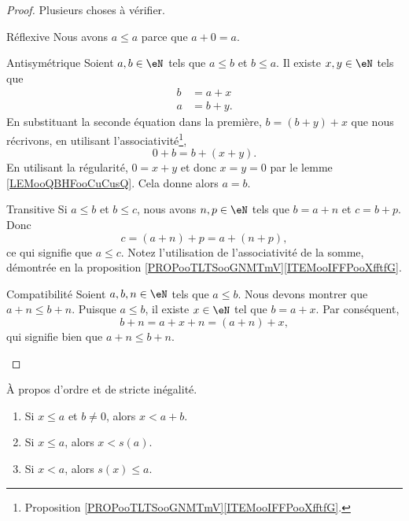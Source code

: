 \begin{proof}
	Plusieurs choses à vérifier.
	\begin{subproof}
		\item[Réflexive]
		Nous avons \( a\leq a\) parce que \( a+0=a\).
		\item[Antisymétrique]
		Soient \( a,b\in \eN\) tels que \( a\leq b\) et \( b\leq a\). Il existe \( x,y\in \eN\) tels que
		\begin{subequations}
			\begin{align}
				b & =a+x  \\
				a & =b+y.
			\end{align}
		\end{subequations}
		En substituant la seconde équation dans la première, \( b=(b+y)+x\) que nous récrivons, en utilisant l'associativité\footnote{Proposition \ref{PROPooTLTSooGNMTmV}\ref{ITEMooIFFPooXfftfG}.},
		\begin{equation}
			0+b=b+(x+y).
		\end{equation}
		En utilisant la régularité, \( 0=x+y\) et donc \( x=y=0\) par le lemme \ref{LEMooQBHFooCuCusQ}. Cela donne alors \( a=b\).
		\item[Transitive]
		Si \( a\leq b\) et \( b\leq c\), nous avons \( n,p\in \eN\) tels que \( b=a+n\) et \( c=b+p\). Donc
		\begin{equation}
			c=(a+n)+p=a+(n+p),
		\end{equation}
		ce qui signifie que \( a\leq c\). Notez l'utilisation de l'associativité de la somme, démontrée en la proposition \ref{PROPooTLTSooGNMTmV}\ref{ITEMooIFFPooXfftfG}.
		\item[Compatibilité]
		Soient \( a,b,n\in \eN\) tels que \( a\leq b\). Nous devons montrer que \( a+n\leq b+n\). Puisque \( a\leq b\), il existe \( x\in \eN\) tel que \( b=a+x\). Par conséquent,
		\begin{equation}
			b+n=a+x+n=(a+n)+x,
		\end{equation}
		qui signifie bien que \( a+n\leq b+n\).
	\end{subproof}
\end{proof}

\begin{lemma}       \label{LEMooPVRQooXPMKTt}
	À propos d'ordre et de stricte inégalité.
	\begin{enumerate}
		\item       \label{ITEMooGWWFooYGPCZw}
		      Si \( x\leq a\) et \( b\neq 0\), alors \( x<a+b\).
		\item       \label{ITEMooRWGWooAfkrri}
		      Si \( x\leq a\), alors \( x<s(a)\).
		\item       \label{ITEMooWCOIooMWrCag}
		      Si \( x<a\), alors \( s(x)\leq a\).
	\end{enumerate}
\end{lemma}

